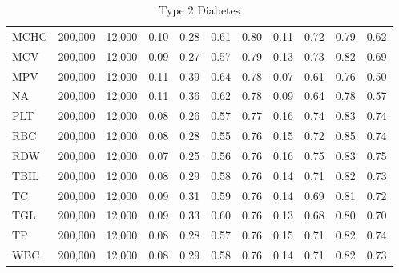 \begin{table}[ht]
\begin{tabular}{lrrrrrrrrrr}
MCHC & 200,000 & 12,000 & 0.10 & 0.28 & 0.61 & 0.80 & 0.11 & 0.72 & 0.79 & 0.62 \\
MCV & 200,000 & 12,000 & 0.09 & 0.27 & 0.57 & 0.79 & 0.13 & 0.73 & 0.82 & 0.69 \\
MPV & 200,000 & 12,000 & 0.11 & 0.39 & 0.64 & 0.78 & 0.07 & 0.61 & 0.76 & 0.50 \\
NA & 200,000 & 12,000 & 0.11 & 0.36 & 0.62 & 0.78 & 0.09 & 0.64 & 0.78 & 0.57 \\
PLT & 200,000 & 12,000 & 0.08 & 0.26 & 0.57 & 0.77 & 0.16 & 0.74 & 0.83 & 0.74 \\
RBC & 200,000 & 12,000 & 0.08 & 0.28 & 0.55 & 0.76 & 0.15 & 0.72 & 0.85 & 0.74 \\
RDW & 200,000 & 12,000 & 0.07 & 0.25 & 0.56 & 0.76 & 0.16 & 0.75 & 0.83 & 0.75 \\
TBIL & 200,000 & 12,000 & 0.08 & 0.29 & 0.58 & 0.76 & 0.14 & 0.71 & 0.82 & 0.73 \\
TC & 200,000 & 12,000 & 0.09 & 0.31 & 0.59 & 0.76 & 0.14 & 0.69 & 0.81 & 0.72 \\
TGL & 200,000 & 12,000 & 0.09 & 0.33 & 0.60 & 0.76 & 0.13 & 0.68 & 0.80 & 0.70 \\
TP & 200,000 & 12,000 & 0.08 & 0.28 & 0.57 & 0.76 & 0.15 & 0.71 & 0.82 & 0.74 \\
WBC & 200,000 & 12,000 & 0.08 & 0.29 & 0.58 & 0.76 & 0.14 & 0.71 & 0.82 & 0.73 \\
\bottomrule
\end{tabular}
\caption{Type 2 Diabetes}
\end{table}
